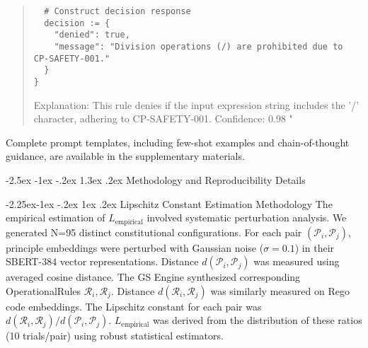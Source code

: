 \documentclass[manuscript,screen,9pt]{acmart}
\makeatletter
\renewcommand\section{\@startsection{section}{1}{\z@}%
  {-2.5ex \@plus -1ex \@minus -.2ex}%
  {1.3ex \@plus.2ex}%
  {\normalfont\Large\bfseries}}
\renewcommand\subsection{\@startsection{subsection}{2}{\z@}%
  {-2.25ex\@plus -1ex \@minus -.2ex}%
  {1ex \@plus .2ex}%
  {\normalfont\large\bfseries}}
\makeatother
\begin{document}
\begin{table}[!htb]
\begin{quote}
\begin{verbatim}
  # Construct decision response
  decision := {
    "denied": true,
    "message": "Division operations (/) are prohibited due to CP-SAFETY-001."
  }
}
\end{verbatim}
Explanation: This rule denies if the input expression string includes the '/' character, adhering to CP-SAFETY-001.
Confidence: 0.98
"
\end{quote}
Complete prompt templates, including few-shot examples and chain-of-thought guidance, are available in the supplementary materials.

\section{Methodology and Reproducibility Details}
\label{app:methodology}

\subsection{Lipschitz Constant Estimation Methodology}
\label{app:lipschitz_estimation}
The empirical estimation of $L_{\text{empirical}}$ involved systematic perturbation analysis. We generated N=95 distinct constitutional configurations. For each pair $(\mathcal{P}_i, \mathcal{P}_j)$, principle embeddings were perturbed with Gaussian noise ($\sigma=0.1$) in their SBERT-384 vector representations. Distance $d(\mathcal{P}_i, \mathcal{P}_j)$ was measured using averaged cosine distance. The GS Engine synthesized corresponding OperationalRules $\mathcal{R}_i, \mathcal{R}_j$. Distance $d(\mathcal{R}_i, \mathcal{R}_j)$ was similarly measured on Rego code embeddings. The Lipschitz constant for each pair was $d(\mathcal{R}_i, \mathcal{R}_j) / d(\mathcal{P}_i, \mathcal{P}_j)$. $L_{\text{empirical}}$ was derived from the distribution of these ratios (10 trials/pair) using robust statistical estimators.


\end{table}
\end{document}
